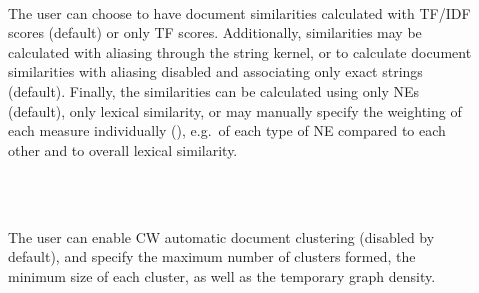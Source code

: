 \begin{description}
\item[] \hfill \\
The user can choose to have document similarities calculated with TF/IDF scores (default) or only TF scores. Additionally, similarities may be calculated with aliasing through the string kernel, or to calculate document similarities with aliasing disabled and associating only exact strings (default). Finally, the similarities can be calculated using only NEs (default), only lexical similarity, or may manually specify the weighting of each measure individually (), e.g.\ of each type of NE compared to each other and to overall lexical similarity. 
\item[] \hfill \\
\item[] \hfill \\
The user can enable CW automatic document clustering (disabled by default), and specify the maximum number of clusters formed, the minimum size of each cluster, as well as the temporary graph density. 
\end{description}

